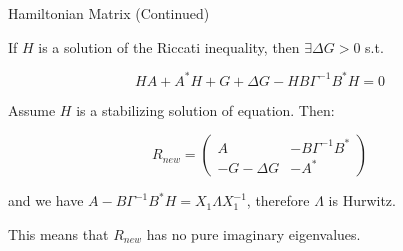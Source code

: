 \begin{frame}{Hamiltonian Matrix (Continued)}

\begin{block}{}
If $H$ is a solution of the Riccati inequality, then $\exists \Delta G  > 0 $ s.t. 

\begin{equation*}\label{REM}
HA + A^{*}H + G + \Delta G - HB\Gamma^{-1}B^{*}H = 0
\end{equation*}
\end{block}

Assume $H$ is a stabilizing solution of equation. Then: 

$$ R_{new} = \left(\begin{array}{cc}
A & -B\Gamma^{-1}B^{*} \\  -G-\Delta G & -A^{*} \end{array}\right)
$$

\noindent and we have $A-B\Gamma^{-1}B^{*}H=X_{1}\Lambda X_{1}^{-1}$, therefore $\Lambda$ is Hurwitz. 

\begin{block}

This means that $R_{new}$ has no pure imaginary eigenvalues.
\end{block}


\end{frame}

%
%

